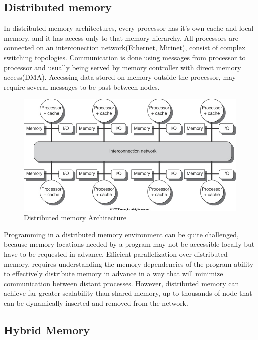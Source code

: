 \subsection{Distributed memory}

In distributed memory architectures, every processor has it's own cache and local memory, and it has access only to that memory hierarchy.  All processors are connected on an interconection network(Ethernet, Mirinet), consist of complex switching topologies. Communication is done using messages from processor to processor and usually being served by memory controller with direct memory access(DMA). Accessing data stored on memory outside the processor, may require several messages to be past between nodes.


\begin{figure}
 \centering
  \includegraphics[scale=0.4]{distributed_memory.jpg}
\caption{Distributed memory Architecture}
\label{Distributed memory architecture}
\end{figure}
Programming in a distributed memory environment can be quite challenged, because memory locations needed by a program may not be accessible locally but have to be requested in advance. Efficient parallelization over distributed memory, requires understanding the memory dependencies of the program ability to effectively distribute memory in advance in a way that will minimize communication between distant processes. However, distributed memory can achieve far greater scalability than shared memory, up to thousands of node that can be dynamically inserted and removed from the network.

\subsection{Hybrid Memory}

